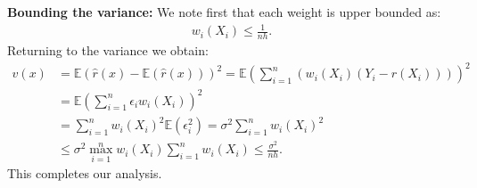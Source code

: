 \documentclass[twoside,12pt]{article}
\begin{document}
{\bf Bounding the variance: } We note first that each weight is upper bounded as:
\begin{align*}
w_i(X_i) \leq \frac{1}{nh}.
\end{align*}
Returning to the variance we obtain:
\begin{align*}
v(x) &= \mathbb{E} (\widehat{r}(x) - \mathbb{E}(\widehat{r}(x)))^2 
= \mathbb{E} \left( \sum_{i=1}^n (w_i(X_i) (Y_i - r(X_i)))\right)^2 \\
&= \mathbb{E} \left( \sum_{i=1}^n \epsilon_i w_i(X_i) \right)^2 \\
&= \sum_{i=1}^n w_i(X_i)^2 \mathbb{E}(\epsilon_i^2) = \sigma^2 \sum_{i=1}^n w_i(X_i)^2  \\
&\leq \sigma^2 \max_{i=1}^n w_i(X_i) \sum_{i=1}^n w_i(X_i) \leq \frac{\sigma^2}{nh}.
\end{align*}
This completes our analysis.

%
%
\end{document}
